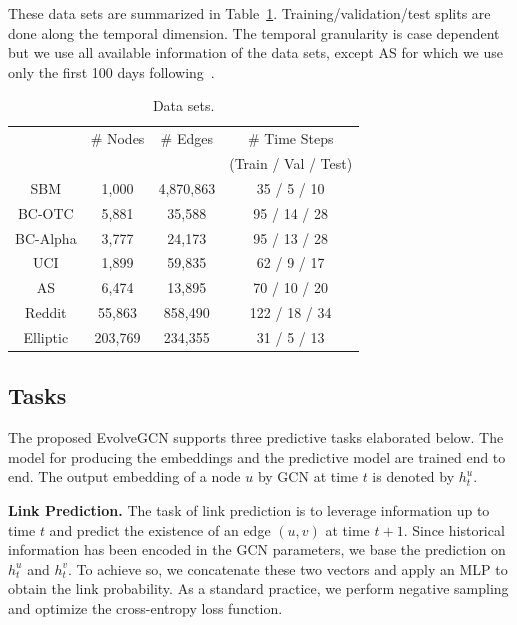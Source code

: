 \documentclass[letterpaper]{article} %
\begin{document}
These data sets are summarized in Table~\ref{tab:dataset}. Training/validation/test splits are done along the temporal dimension. The temporal granularity is case dependent but we use all available information of the data sets, except AS for which we use only the first 100 days following~\cite{Goyal2017}.

\begin{table}[ht]
\centering
\caption{Data sets.}
\label{tab:dataset}
\begin{tabular}{cccc}
\hline
& \# Nodes & \# Edges & \# Time Steps\\
&          &          & (Train / Val / Test) \\
\hline
SBM      & 1,000   & 4,870,863 & 35 / 5 / 10 \\
BC-OTC   & 5,881   & 35,588  & 95 / 14 / 28 \\
BC-Alpha & 3,777   & 24,173  & 95 / 13 / 28 \\
UCI      & 1,899   & 59,835  & 62 / 9 / 17 \\
AS       & 6,474   & 13,895  & 70 / 10 / 20 \\ 
Reddit   & 55,863  & 858,490 & 122 / 18 / 34 \\
Elliptic & 203,769 & 234,355 & 31 / 5 / 13 \\
\hline
\end{tabular}
\end{table}


\subsection{Tasks}
The proposed EvolveGCN supports three predictive tasks elaborated below. The model for producing the embeddings and the predictive model are trained end to end. The output embedding of a node $u$ by GCN at time $t$ is denoted by $h_t^u$.

\vskip5pt \noindent
\textbf{Link Prediction.}
The task of link prediction is to leverage information up to time $t$ and predict the existence of an edge $(u,v)$ at time $t+1$. Since historical information has been encoded in the GCN parameters, we base the prediction on $h_t^u$ and $h_t^v$. To achieve so, we concatenate these two vectors and apply an MLP to obtain the link probability. As a standard practice, we perform negative sampling and optimize the cross-entropy loss function.
\end{document}
